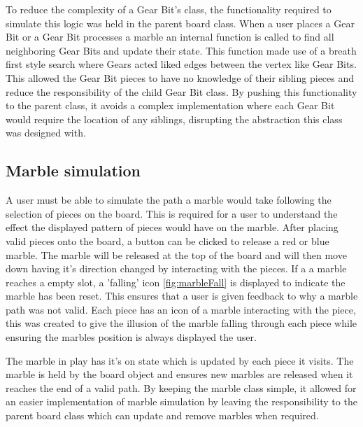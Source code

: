 \documentclass{l4proj}
\begin{document}
To reduce the complexity of a Gear Bit's class, the functionality required to simulate this logic was held in the parent board class. When a user places a Gear Bit or a Gear Bit processes a marble an internal function is called to find all neighboring Gear Bits and update their state. This function made use of a breath first style search where Gears acted liked edges between the vertex like Gear Bits. This allowed the Gear Bit pieces to have no knowledge of their sibling pieces and reduce the responsibility of the child Gear Bit class. By pushing this functionality to the parent class, it avoids a complex implementation where each Gear Bit would require the location of any siblings, disrupting the abstraction this class was designed with.

\subsection{Marble simulation}
A user must be able to simulate the path a marble would take following the selection of pieces on the board. This is required for a user to understand the effect the displayed pattern of pieces would have on the marble. After placing valid pieces onto the board, a button can be clicked to release a red or blue marble. The marble will be released at the top of the board and will then move down having it's direction changed by interacting with the pieces. If a a marble reaches a empty slot, a 'falling' icon \ref{fig:marbleFall} is displayed to indicate the marble has been reset. This ensures that a user is given feedback to why a marble path was not valid. Each piece has an icon of a marble interacting with the piece, this was created to give the illusion of the marble falling through each piece while ensuring the marbles position is always displayed the user.

The marble in play has it's on state which is updated by each piece it visits. The marble is held by the board object and ensures new marbles are released when it reaches the end of a valid path. By keeping the marble class simple, it allowed for an easier implementation of marble simulation by leaving the responsibility to the parent board class which can update and remove marbles when required. 

\end{document}
